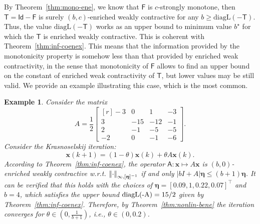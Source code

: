 \documentclass[journal,twoside,web]{ieeecolor}
\makeatletter
\newcommand{\abs}[1]{{\left\vert #1 \right\vert}}
\newcommand{\norm}[1]{{\left\vert\kern-0.25ex\left\vert #1\right\vert\kern-0.25ex\right\vert}}
\newcommand{\xb}{\boldsymbol{x}}
\newcommand{\etab}{\boldsymbol{\eta}}
\newcommand{\Fs}{\mathsf{F}}
\newcommand{\Ts}{\mathsf{T}}
\newcommand{\Is}{\mathsf{Id}}
\newcommand{\As}{\mathsf{A}}
\newcommand{\diego}[1]{\color{red}{ @Diego: #1} \color{black}}
\newtheorem{exmp}{Example}
\makeatother
\begin{document}
By Theorem~\ref{thm:mono-ene}, we know that $\Fs$ is $c$-strongly monotone, then $\Ts = \Is-\Fs$ is surely $(b,c)$-enriched weakly contractive for any $b\geq\text{diagL}(-\Ts)$.
%
Thus, the value $\text{diagL}(-\Ts)$ works as an upper bound to minimum value $b^\star$ for which the $\Ts$ is enriched weakly contractive. This is coherent with Theorem~\ref{thm:inf-coenex}. 
%
This means that the information provided by the monotonicity property is somehow less than that provided by enriched weak contractivity, in the sense that monotonicity of $\Fs$ allows to find an upper bound on the constant of enriched weak contractivity of $\Ts$, but lower values may be still valid.
%
We provide an example illustrating this case, which is the most common.
%

\begin{exmp}\label{exmp:largerss}
Consider the matrix
\begin{equation}\label{eq:largerss}
A = \frac{1}{2}\begin{bmatrix*}[r]
    -3&     0&    1&     -3\\
    3&    -15&    -12&     -1\\
    2&     -1&    -5&     -5\\
    -2&     0&     -1&    -6
\end{bmatrix*}.
\end{equation}
%
Consider the Krasnoselskij iteration:
%
$$
\xb(k+1) = (1-\theta)\xb(k) + \theta A\xb(k).
$$
%
According to Theorem~\ref{thm:inf-coenex}, the operator $\As:\xb\mapsto A\xb$ is $(b,0)$-enriched weakly contractive w.r.t. $\norm{\cdot}_{\infty,[\etab]^{-1}}$ if and only ${\abs{bI+A}\etab \leq (b+1)\etab}$. 
%
It can be verified that this holds with the choices of ${\etab = [0.09,1,0.22,0.07]^\top}$ and $b = 4$, which satisfies the upper bound $\textnormal{diagL(-A)} = 15/2$ given by Theorem~\ref{thm:inf-coenex}.
%
Therefore, by Theorem~\ref{thm:nonlin-bene} the iteration converges for ${\theta\in(0,\frac{1}{b+1})}$, i.e., ${\theta\in(0,0.2)}$.


\end{exmp}
\end{document}
